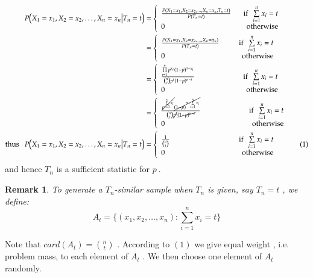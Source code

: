\documentclass[14pt,twoside,a4paper,fleqn]{article}
\theoremstyle{plain}
\newtheorem{remark}{Remark}[section]
\begin{document}
\begin{equation*}
\begin{split}
	P\big(X_1=x_1,X_2=x_2,\ldots,X_n=x_n \big| T_n = t\big)&=\left\{
		\begin{array}{lr}
		\frac{P(X_1=x_1,X_2=x_2,\ldots,X_n=x_n , T_n = t)}{P(T_n = t)} &\tab[0.25cm] \text{if }\ \sum\limits_{i=1}^n x_i = t \\
		0 &\tab[0.25cm] \text{otherwise}
		\end{array}
		\right.\\
		&=\left\{
		\begin{array}{lr}
		\frac{P(X_1=x_1,X_2=x_2,\ldots,X_n=x_n)}{P(T_n = t)}
		 &\tab[0.6cm] \text{if }\ \sum\limits_{i=1}^n x_i = t \\
		 0 &\tab[0.6cm] \text{otherwise}
		\end{array}
		\right.\\
		&=\left\{
		\begin{array}{lr}
		\frac{\prod \limits_{i=1}^n p^{x_i}(1-p)^{1-x_i}}{\binom{n}{t}p^t (1-p)^{n-t}}
		&\tab[2cm] \text{if }\ \sum\limits_{i=1}^n x_i = t \\
		0 &\tab[2cm]\text{otherwise}
		\end{array}
		\right.\\
		&=\left\{
		\begin{array}{lr}
		\frac{\cancel{p^{\sum\limits_{i=1}^n x_i}}\cancel{(1-p)^{n-\sum\limits_{i=1}^n x_i}}}{\binom{n}{t} \cancel{p^t}\cancel{(1-p)^{n-t}}}
		&\tab[2cm] \text{if }\ \sum\limits_{i=1}^n x_i = t \\
		0&\tab[2cm]\text{otherwise}
		\end{array}
		\right.\\
	\text{thus\ }\ \ P\big(X_1=x_1,X_2=x_2,\ldots,X_n=x_n \big| T_n = t\big)&=
		\left\{
		\begin{array}{lr}
		\frac{1}{\binom{n}{t}}
		&\tab[3cm] \text{if }\ \sum\limits_{i=1}^n x_i = t \\
		0&\tab[3cm]\text{otherwise}
		\end{array}
		\right.\tab (1)
\end{split}
\end{equation*}
and hence $T_n$ is a sufficient statistic for $p\ $.
\begin{remark}
To generate a $T_n$-similar sample when $T_n$ is given, say $T_n = t$ , we define:
$$
	A_t = \big\{(x_1,x_2,\ldots,x_n)\colon \sum\limits_{i=1}^n x_i = t\big\}
$$
\end{remark}
Note that $card(A_t)=\binom{n}{t}$ . According to $(1)$ we give equal weight , i.e. problem mass, to each element of $A_t$ . We then choose one element of $A_t$ randomly.
\end{document}
